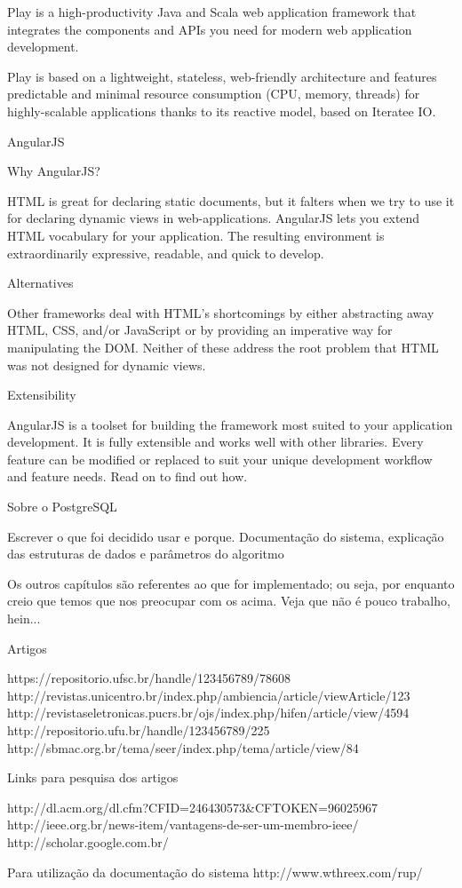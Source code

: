 \documentclass{article}
\begin{document}
Play is a high-productivity Java and Scala web application framework that integrates the components and APIs you need for modern web application development.

Play is based on a lightweight, stateless, web-friendly architecture and features predictable and minimal resource consumption (CPU, memory, threads) for highly-scalable applications thanks to its reactive model, based on Iteratee IO.

AngularJS

Why AngularJS?

HTML is great for declaring static documents, but it falters when we try to use it for declaring dynamic views in web-applications. AngularJS lets you extend HTML vocabulary for your application. The resulting environment is extraordinarily expressive, readable, and quick to develop.

Alternatives

Other frameworks deal with HTML’s shortcomings by either abstracting away HTML, CSS, and/or JavaScript or by providing an imperative way for manipulating the DOM. Neither of these address the root problem that HTML was not designed for dynamic views.

Extensibility

AngularJS is a toolset for building the framework most suited to your application development. It is fully extensible and works well with other libraries. Every feature can be modified or replaced to suit your unique development workflow and feature needs. Read on to find out how.

Sobre o PostgreSQL



Escrever o que foi decidido usar e porque. Documentação do sistema,
explicação das estruturas de dados e parâmetros do algoritmo


Os outros capítulos são referentes ao que for implementado; ou seja,
por enquanto creio que temos que nos preocupar com os acima. Veja que
não é pouco trabalho, hein...




Artigos

https://repositorio.ufsc.br/handle/123456789/78608
http://revistas.unicentro.br/index.php/ambiencia/article/viewArticle/123
http://revistaseletronicas.pucrs.br/ojs/index.php/hifen/article/view/4594
http://repositorio.ufu.br/handle/123456789/225
http://sbmac.org.br/tema/seer/index.php/tema/article/view/84


Links para pesquisa dos artigos

http://dl.acm.org/dl.cfm?CFID=246430573&CFTOKEN=96025967
http://ieee.org.br/news-item/vantagens-de-ser-um-membro-ieee/
http://scholar.google.com.br/

Para utilização da documentação do sistema
http://www.wthreex.com/rup/
\end{document}

